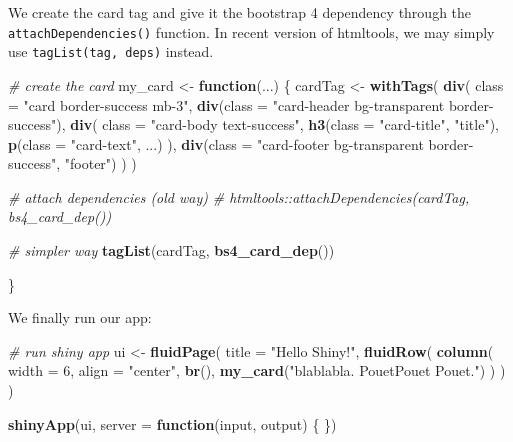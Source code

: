 \documentclass[
]{book}
\newenvironment{Shaded}{\begin{snugshade}}{\end{snugshade}}
\newcommand{\CommentTok}[1]{\textcolor[rgb]{0.56,0.35,0.01}{\textit{#1}}}
\newcommand{\ControlFlowTok}[1]{\textcolor[rgb]{0.13,0.29,0.53}{\textbf{#1}}}
\newcommand{\DataTypeTok}[1]{\textcolor[rgb]{0.13,0.29,0.53}{#1}}
\newcommand{\DecValTok}[1]{\textcolor[rgb]{0.00,0.00,0.81}{#1}}
\newcommand{\KeywordTok}[1]{\textcolor[rgb]{0.13,0.29,0.53}{\textbf{#1}}}
\newcommand{\NormalTok}[1]{#1}
\newcommand{\StringTok}[1]{\textcolor[rgb]{0.31,0.60,0.02}{#1}}
\begin{document}
We create the card tag and give it the bootstrap 4 dependency through the \texttt{attachDependencies()} function. In recent version of htmltools, we may simply use
\texttt{tagList(tag,\ deps)} instead.

\begin{Shaded}
\begin{Highlighting}[]
\CommentTok{# create the card}
\NormalTok{my_card <-}\StringTok{ }\ControlFlowTok{function}\NormalTok{(...) \{}
\NormalTok{  cardTag <-}\StringTok{ }\KeywordTok{withTags}\NormalTok{(}
    \KeywordTok{div}\NormalTok{(}
      \DataTypeTok{class =} \StringTok{"card border-success mb-3"}\NormalTok{,}
      \KeywordTok{div}\NormalTok{(}\DataTypeTok{class =} \StringTok{"card-header bg-transparent border-success"}\NormalTok{),}
      \KeywordTok{div}\NormalTok{(}
        \DataTypeTok{class =} \StringTok{"card-body text-success"}\NormalTok{,}
        \KeywordTok{h3}\NormalTok{(}\DataTypeTok{class =} \StringTok{"card-title"}\NormalTok{, }\StringTok{"title"}\NormalTok{),}
        \KeywordTok{p}\NormalTok{(}\DataTypeTok{class =} \StringTok{"card-text"}\NormalTok{, ...)}
\NormalTok{      ),}
      \KeywordTok{div}\NormalTok{(}\DataTypeTok{class =} \StringTok{"card-footer bg-transparent border-success"}\NormalTok{, }\StringTok{"footer"}\NormalTok{)}
\NormalTok{    )}
\NormalTok{  )}
  
  \CommentTok{# attach dependencies (old way)}
  \CommentTok{# htmltools::attachDependencies(cardTag, bs4_card_dep())}
  
  \CommentTok{# simpler way}
  \KeywordTok{tagList}\NormalTok{(cardTag, }\KeywordTok{bs4_card_dep}\NormalTok{())}
  
\NormalTok{\}}
\end{Highlighting}
\end{Shaded}

We finally run our app:

\begin{Shaded}
\begin{Highlighting}[]
\CommentTok{# run shiny app }
\NormalTok{ui <-}\StringTok{ }\KeywordTok{fluidPage}\NormalTok{(}
  \DataTypeTok{title =} \StringTok{"Hello Shiny!"}\NormalTok{,}
  \KeywordTok{fluidRow}\NormalTok{(}
    \KeywordTok{column}\NormalTok{(}
      \DataTypeTok{width =} \DecValTok{6}\NormalTok{,}
      \DataTypeTok{align =} \StringTok{"center"}\NormalTok{,}
      \KeywordTok{br}\NormalTok{(),}
      \KeywordTok{my_card}\NormalTok{(}\StringTok{"blablabla. PouetPouet Pouet."}\NormalTok{)}
\NormalTok{    )}
\NormalTok{  )}
\NormalTok{)}

\KeywordTok{shinyApp}\NormalTok{(ui, }\DataTypeTok{server =} \ControlFlowTok{function}\NormalTok{(input, output) \{ \})}
\end{Highlighting}
\end{Shaded}
\end{document}
